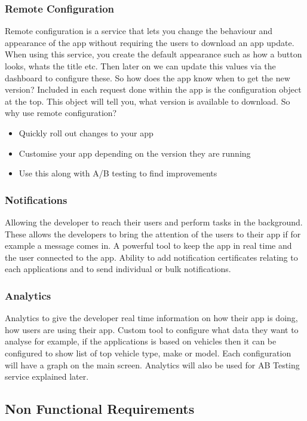 \subsubsection{Remote Configuration}
Remote configuration is a service that lets you change the behaviour and appearance of the app without requiring the users to download an app update. When using this service, you create the default appearance such as how a button looks, whats the title etc. Then later on we can update this values via the dashboard to configure these. So how does the app know when to get the new version? Included in each request done within the app is the configuration object at the top. This object will tell you, what version is available to download. So why use remote configuration? 
\begin{itemize}
  \item Quickly roll out changes to your app
  \item Customise your app depending on the version they are running
  \item Use this along with A/B testing to find improvements
\end{itemize}

\subsubsection{Notifications}
Allowing the developer to reach their users and perform tasks in the background. These allows the developers to bring the attention of the users to their app if for example a message comes in. A powerful tool to keep the app in real time and the user connected to the app. Ability to add notification certificates relating to each applications and to send individual or bulk notifications.

\subsubsection{Analytics}
Analytics to give the developer real time information on how their app is doing, how users are using their app. Custom tool to configure what data they want to analyse for example, if the applications is based on vehicles then it can be configured to show list of top vehicle type, make or model. Each configuration will have a graph on the main screen. Analytics will also be used for AB Testing service explained later.

\subsection{Non Functional Requirements}

